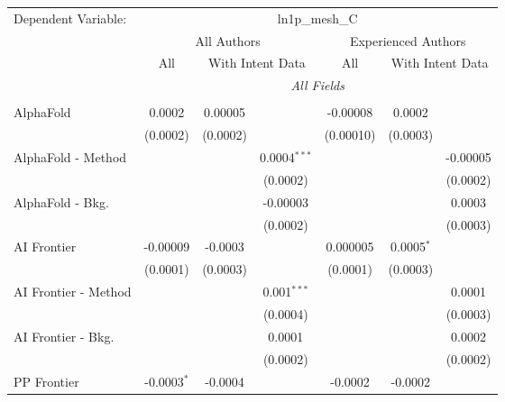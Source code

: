 \begingroup
\centering
\begin{tabular}{lcccccc}
   \tabularnewline \midrule \midrule
   Dependent Variable: & \multicolumn{6}{c}{ln1p\_mesh\_C}\\
 & \multicolumn{3}{c}{All Authors} & \multicolumn{3}{c}{Experienced Authors} \\
\cmidrule(lr){2-4} \cmidrule(lr){5-7}
 & \multicolumn{1}{c}{All} & \multicolumn{2}{c}{With Intent Data} & \multicolumn{1}{c}{All} & \multicolumn{2}{c}{With Intent Data} \\
\cmidrule(lr){2-2} \cmidrule(lr){3-4} \cmidrule(lr){5-5} \cmidrule(lr){6-7}
 & \multicolumn{6}{c}{\textit{All Fields}} \\ \\
   AlphaFold            & 0.0002        & 0.00005  &                & -0.00008  & 0.0002          &   \\   
                        & (0.0002)      & (0.0002) &                & (0.00010) & (0.0003)        &   \\   
   AlphaFold - Method   &               &          & 0.0004$^{***}$ &           &                 & -0.00005\\   
                        &               &          & (0.0002)       &           &                 & (0.0002)\\   
   AlphaFold - Bkg.     &               &          & -0.00003       &           &                 & 0.0003\\   
                        &               &          & (0.0002)       &           &                 & (0.0003)\\   
   AI Frontier          & -0.00009      & -0.0003  &                & 0.000005  & 0.0005$^{*}$    &   \\   
                        & (0.0001)      & (0.0003) &                & (0.0001)  & (0.0003)        &   \\   
   AI Frontier - Method &               &          & 0.001$^{***}$  &           &                 & 0.0001\\   
                        &               &          & (0.0004)       &           &                 & (0.0003)\\   
   AI Frontier - Bkg.   &               &          & 0.0001         &           &                 & 0.0002\\   
                        &               &          & (0.0002)       &           &                 & (0.0002)\\   
   PP Frontier          & -0.0003$^{*}$ & -0.0004  &                & -0.0002   & -0.0002         &   \\   

\end{tabular}
